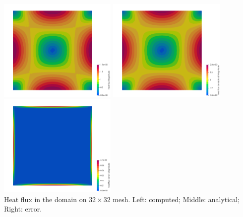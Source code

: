 \begin{center}
\includegraphics[width=5.7cm]{python_codes/fieldstone_173/results/exp2/q}
\includegraphics[width=5.7cm]{python_codes/fieldstone_173/results/exp2/q_analytical}
\includegraphics[width=5.7cm]{python_codes/fieldstone_173/results/exp2/q_error}\\
{\captionfont Heat flux in the domain on $32 \times 32$ mesh. 
Left: computed; Middle: analytical; Right: error.}
\end{center}


